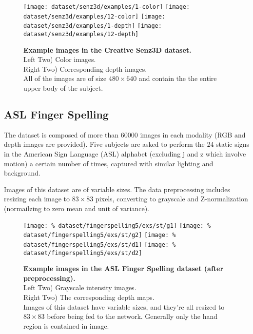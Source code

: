 \begin{figure}[H]
  \centering
  \hfill
  \texttt{[image: dataset/senz3d/examples/1-color]}
  \hfill
  \texttt{[image: dataset/senz3d/examples/12-color]}
  \hfill
  \texttt{[image: dataset/senz3d/examples/1-depth]}
  \hfill
  \texttt{[image: dataset/senz3d/examples/12-depth]}
  \caption{%
    \textbf{Example images in the Creative Senz3D dataset.}\\[0.1em]
    Left Two) Color images.\\[0.1em]
    Right Two) Corresponding depth images.\\[0.1em]
    All of the images are of size $480 \times 640$ and contain the
      the entire upper body of the subject.}
  \label{fig:senz3d_exs}
\end{figure}

\subsection{ASL Finger Spelling}

The dataset is composed of more than 60000 images in each modality
(RGB and depth images are provided).
Five subjects are asked to perform the 24 static signs in
the American Sign Language (ASL) alphabet (excluding j and z which involve
motion) a certain number of times, captured with similar lighting
and background.

Images of this dataset are of variable sizes. The data preprocessing
includes resizing each image to $83 \times 83$ pixels,
converting to grayscale and Z-normalization (normailzing to zero mean
and unit of variance).

\begin{figure}[H]
  \centering
  \hfill
  \texttt{[image: \%
    dataset/fingerspelling5/exs/st/g1]}
  \hfill
  \texttt{[image: \%
    dataset/fingerspelling5/exs/st/g2]}
  \hfill
  \texttt{[image: \%
    dataset/fingerspelling5/exs/st/d1]}
  \hfill
  \texttt{[image: \%
    dataset/fingerspelling5/exs/st/d2]}
  \caption{%
    \textbf{Example images in the ASL Finger Spelling dataset
      (after preprocessing).}\\[0.1em]
    Left Two) Grayscale intensity images.\\[0.1em]
    Right Two) The corresponding depth maps.\\[0.1em]
    Images of this dataset have variable sizes, and they're all resized to
      $83 \times 83$ before being fed to the network. Generally only the
      hand region is contained in image.}
  \label{fig:fingerspelling_exs}
\end{figure}

